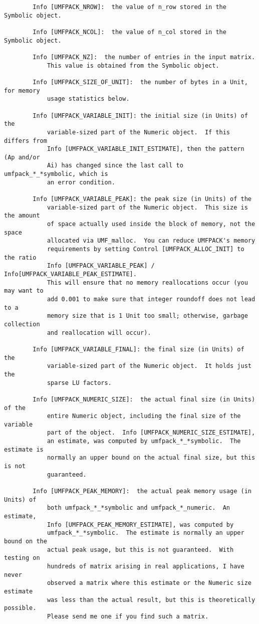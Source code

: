 \documentclass[11pt]{article}
\begin{document}
{\begin{verbatim}
        Info [UMFPACK_NROW]:  the value of n_row stored in the Symbolic object.

        Info [UMFPACK_NCOL]:  the value of n_col stored in the Symbolic object.

        Info [UMFPACK_NZ]:  the number of entries in the input matrix.
            This value is obtained from the Symbolic object.

        Info [UMFPACK_SIZE_OF_UNIT]:  the number of bytes in a Unit, for memory
            usage statistics below.

        Info [UMFPACK_VARIABLE_INIT]: the initial size (in Units) of the
            variable-sized part of the Numeric object.  If this differs from
            Info [UMFPACK_VARIABLE_INIT_ESTIMATE], then the pattern (Ap and/or
            Ai) has changed since the last call to umfpack_*_*symbolic, which is
            an error condition.

        Info [UMFPACK_VARIABLE_PEAK]: the peak size (in Units) of the
            variable-sized part of the Numeric object.  This size is the amount
            of space actually used inside the block of memory, not the space
            allocated via UMF_malloc.  You can reduce UMFPACK's memory
            requirements by setting Control [UMFPACK_ALLOC_INIT] to the ratio
            Info [UMFPACK_VARIABLE_PEAK] / Info[UMFPACK_VARIABLE_PEAK_ESTIMATE].
            This will ensure that no memory reallocations occur (you may want to
            add 0.001 to make sure that integer roundoff does not lead to a
            memory size that is 1 Unit too small; otherwise, garbage collection
            and reallocation will occur).

        Info [UMFPACK_VARIABLE_FINAL]: the final size (in Units) of the
            variable-sized part of the Numeric object.  It holds just the
            sparse LU factors.

        Info [UMFPACK_NUMERIC_SIZE]:  the actual final size (in Units) of the
            entire Numeric object, including the final size of the variable
            part of the object.  Info [UMFPACK_NUMERIC_SIZE_ESTIMATE],
            an estimate, was computed by umfpack_*_*symbolic.  The estimate is
            normally an upper bound on the actual final size, but this is not
            guaranteed.

        Info [UMFPACK_PEAK_MEMORY]:  the actual peak memory usage (in Units) of
            both umfpack_*_*symbolic and umfpack_*_numeric.  An estimate,
            Info [UMFPACK_PEAK_MEMORY_ESTIMATE], was computed by
            umfpack_*_*symbolic.  The estimate is normally an upper bound on the
            actual peak usage, but this is not guaranteed.  With testing on
            hundreds of matrix arising in real applications, I have never
            observed a matrix where this estimate or the Numeric size estimate
            was less than the actual result, but this is theoretically possible.
            Please send me one if you find such a matrix.


\end{verbatim}}
\end{document}
